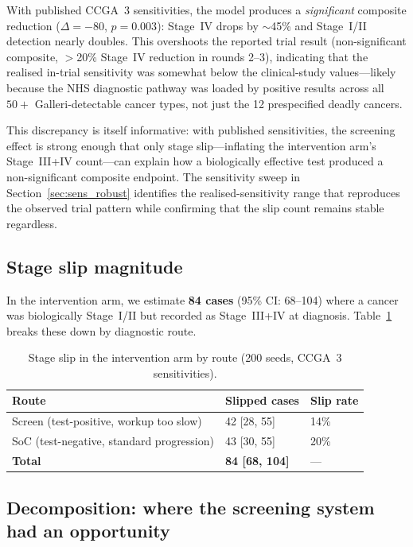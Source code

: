 \documentclass[11pt,letter]{article}
\begin{document}
\noindent With published CCGA~3 sensitivities, the model produces a
\emph{significant} composite reduction ($\Delta = -80$, $p = 0.003$):
Stage~IV drops by ${\sim}$45\% and Stage~I/II detection nearly doubles.
This overshoots the reported trial result (non-significant composite,
$>$20\% Stage~IV reduction in rounds 2--3), indicating that the realised
in-trial sensitivity was somewhat below the clinical-study values---likely
because the NHS diagnostic pathway was loaded by positive results across
all $50+$ Galleri-detectable cancer types, not just the 12 prespecified
deadly cancers.

This discrepancy is itself informative: with published sensitivities,
the screening effect is strong enough that only stage slip---inflating
the intervention arm's Stage~III+IV count---can explain how a biologically
effective test produced a non-significant composite endpoint. The
sensitivity sweep in Section~\ref{sec:sens_robust} identifies the
realised-sensitivity range that reproduces the observed trial pattern
while confirming that the slip count remains stable regardless.


\subsection{Stage slip magnitude}

In the intervention arm, we estimate \textbf{84 cases} (95\% CI: 68--104)
where a cancer was biologically Stage~I/II but recorded as Stage~III+IV at
diagnosis. Table~\ref{tab:slip_detail} breaks these down by diagnostic
route.

\begin{table}[!ht]\centering
\caption{Stage slip in the intervention arm by route (200 seeds, CCGA~3
sensitivities).}
\label{tab:slip_detail}
\begin{tabular}{lll}\toprule
Route & Slipped cases & Slip rate \\ \midrule
Screen (test-positive, workup too slow) & 42 [28, 55] & 14\% \\
SoC (test-negative, standard progression) & 43 [30, 55] & 20\% \\
\midrule
\textbf{Total} & \textbf{84 [68, 104]} & --- \\
\bottomrule
\end{tabular}
\end{table}


\subsection{Decomposition: where the screening system had an opportunity}
\label{sec:decomposition}
\end{document}
